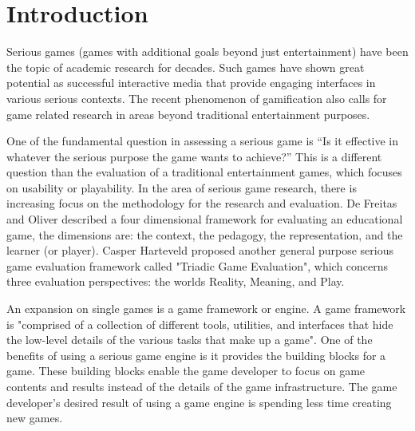 \documentclass{sigchi}
\begin{document}

\section{Introduction}

Serious games (games with additional goals beyond just entertainment)
have been the topic of academic research for
decades\cite{Zyda2005}. Such games have shown great potential as successful
interactive media that provide engaging interfaces in various serious
contexts\cite{mcgonigal2011reality,reeves2009total}. The recent phenomenon
of gamification\cite{Deterding2011mt} also calls for game related
research in areas beyond traditional entertainment purposes.

One of the fundamental question in assessing a serious game is ``Is it
effective in whatever the serious purpose the game wants to achieve?''
This is a different question than the evaluation of a traditional
entertainment games, which focuses on usability or
playability\cite{song2007new}. In the area of serious game research,
there is increasing focus on the methodology for the research
and evaluation\cite{Mayer2012233}. De Freitas and
Oliver described a four dimensional framework\cite{de2006can} for
evaluating an educational game, the dimensions are: the context, the pedagogy,
the representation, and the learner (or player). Casper Harteveld
proposed another general purpose serious game evaluation framework
called "Triadic Game Evaluation"\cite{harteveld2010triadic}, which
concerns three evaluation perspectives: the worlds Reality, Meaning,
and Play.


An expansion on single games is a game framework or engine. A game
framework is "comprised of a collection of different tools, utilities,
and interfaces that hide the low-level details of the various tasks
that make up a game"\cite{sherrod2006ultimate}. One of the benefits of
using a serious game engine is it provides the building blocks for a
game. These building blocks enable the game developer to focus on game
contents and results instead of the details of the game
infrastructure. The game developer's desired result of using a game
engine is spending less time creating new games.
\end{document}
